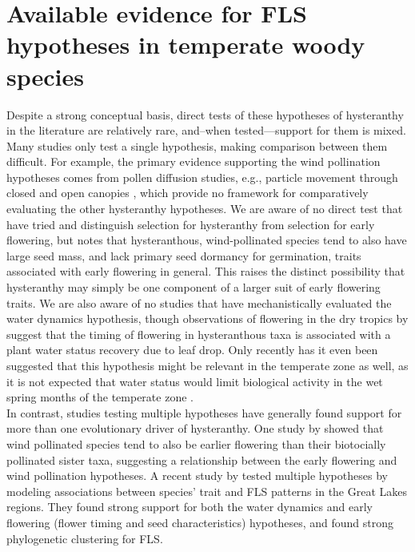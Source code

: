 \documentclass[12pt]{article}\usepackage[]{graphicx}\usepackage[]{color}
\begin{document}
\section*{Available evidence for FLS hypotheses in temperate woody species} 
\indent\indent Despite a strong conceptual basis, direct tests of these hypotheses of hysteranthy in the literature are relatively rare, and--when tested---support for them is mixed. Many studies only test a single hypothesis, making comparison between them difficult. For example, the primary evidence supporting the wind pollination hypotheses comes from pollen diffusion studies, e.g., particle movement through closed and open canopies \citep{Niklas1985,Nathan2005, Milleron2012}, which provide no framework for comparatively evaluating the other hysteranthy hypotheses. We are aware of no direct test that have tried and distinguish selection for hysteranthy from selection for early flowering, but \citet{Primack1987} notes that hysteranthous, wind-pollinated species tend to also have large seed mass, and lack primary seed dormancy for germination, traits associated with early flowering in general. This raises the distinct possibility that hysteranthy may simply be one component of a larger suit of early flowering traits. We are also aware of no studies that have mechanistically evaluated the water dynamics hypothesis, though observations of flowering in the dry tropics by \citet{Borchert1983,Reich1984} suggest that the timing of flowering in hysteranthous taxa is associated with a plant water status recovery due to leaf drop. Only recently has it even been suggested that this hypothesis might be relevant in the temperate zone as well, as it is not expected that water status would limit biological activity in the wet spring months of the temperate zone \citep{Gougherty2018}.\\
\indent In contrast, studies testing multiple hypotheses have generally found support for more than one evolutionary driver of hysteranthy. One study by \citet{Bolmgren2003} showed that wind pollinated species tend to also be earlier flowering than their biotocially pollinated sister taxa, suggesting a relationship between the early flowering and wind pollination hypotheses. A recent study by \citet{Gougherty2018} tested multiple hypotheses by modeling associations between species' trait and FLS patterns in the Great Lakes regions. They found strong support for both the water dynamics and early flowering (flower timing and seed characteristics) hypotheses, and found strong phylogenetic clustering for FLS. \\
\end{document}
